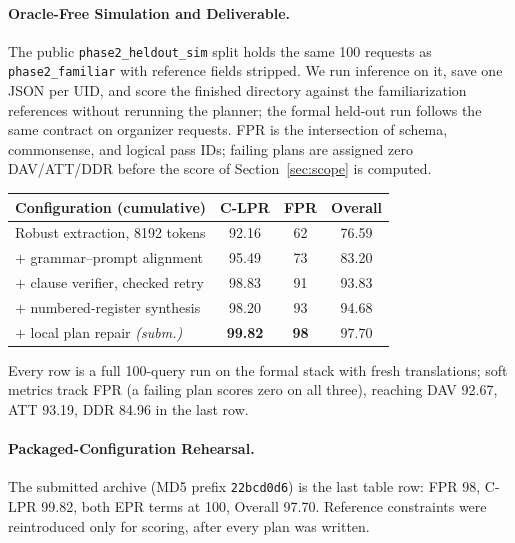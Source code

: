 \documentclass{article}
\begin{document}
\paragraph{Oracle-Free Simulation and Deliverable.}
The public \texttt{phase2\_heldout\_sim} split holds the same 100 requests
as \texttt{phase2\_familiar} with reference fields stripped. We run
inference on it, save one JSON per UID, and score the finished directory
against the familiarization references without rerunning the planner; the
formal held-out run follows the same contract on organizer requests. FPR is the intersection of schema, commonsense, and logical pass
IDs; failing plans are assigned zero DAV/ATT/DDR before the score of
Section~\ref{sec:scope} is computed.
 
\begin{center}
\small
\begin{tabular}{@{}lccc@{}}
\toprule
Configuration (cumulative) & C-LPR & FPR & Overall\\
\midrule
Robust extraction, 8192 tokens        & 92.16 & 62 & 76.59\\
$+$ grammar--prompt alignment         & 95.49 & 73 & 83.20\\
$+$ clause verifier, checked retry    & 98.83 & 91 & 93.83\\
$+$ numbered-register synthesis       & 98.20 & 93 & 94.68\\
$+$ local plan repair \emph{(subm.)}  & \textbf{99.82} & \textbf{98} & $\mathbf{97.70}$\\
\bottomrule
\end{tabular}
\end{center}
\noindent Every row is a full 100-query run on the formal stack with fresh
translations; soft metrics track FPR (a failing plan scores zero on all
three), reaching DAV 92.67, ATT 93.19, DDR 84.96 in the last row.

\paragraph{Packaged-Configuration Rehearsal.}
The submitted archive (MD5 prefix \texttt{22bcd0d6}) is the last table row:
FPR 98, C-LPR 99.82, both EPR terms at 100, Overall 97.70. Reference
constraints were reintroduced only for scoring, after every plan was
written.
 
\end{document}

